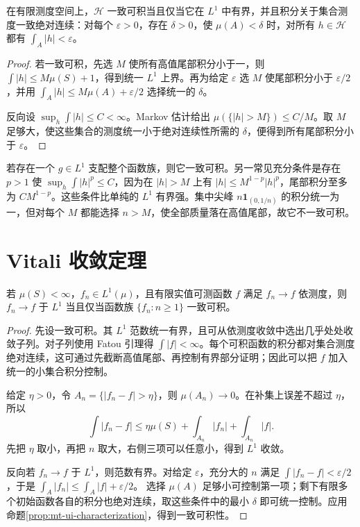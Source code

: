 \documentclass[UTF8,12pt,a4paper,fontset=fandol]{ctexbook}
\begin{document}
\begin{proposition}[一致可积性的等价判别]
在有限测度空间上，$\mathcal H$ 一致可积当且仅当它在 $L^1$ 中有界，并且积分关于集合测度一致绝对连续：对每个 $\varepsilon>0$，存在 $\delta>0$，使 $\mu(A)<\delta$ 时，对所有 $h\in\mathcal H$ 都有 $\int_A|h|<\varepsilon$。
\label{prop:mt-ui-characterization}
\end{proposition}
\begin{proof}
若一致可积，先选 $M$ 使所有高值尾部积分小于一，则
$\int|h|\leq M\mu(S)+1$，得到统一 $L^1$ 上界。再为给定 $\varepsilon$ 选 $M$ 使尾部积分小于 $\varepsilon/2$，并用
$\int_A|h|\leq M\mu(A)+\varepsilon/2$
选择统一的 $\delta$。

反向设 $\sup_h\int|h|\leq C<\infty$。Markov 估计给出
$\mu(\{|h|>M\})\leq C/M$。取 $M$ 足够大，使这些集合的测度统一小于绝对连续性所需的 $\delta$，便得到所有尾部积分小于 $\varepsilon$。
\end{proof}
若存在一个 $g\in L^1$ 支配整个函数族，则它一致可积。另一常见充分条件是存在 $p>1$ 使 $\sup_h\int|h|^p\leq C$，因为在 $|h|>M$ 上有 $|h|\leq M^{1-p}|h|^p$，尾部积分至多为 $CM^{1-p}$。这些条件比单纯的 $L^1$ 有界强。集中尖峰 $n\mathbf1_{(0,1/n)}$ 的积分统一为一，但对每个 $M$ 都能选择 $n>M$，使全部质量落在高值尾部，故它不一致可积。

\section{Vitali 收敛定理}
\begin{theorem}
若 $\mu(S)<\infty$，$f_n\in L^1(\mu)$，且有限实值可测函数 $f$ 满足 $f_n\to f$ 依测度，则 $f_n\to f$ 于 $L^1$ 当且仅当函数族 $\{f_n:n\geq1\}$ 一致可积。
\label{thm:mt-vitali-convergence}
\end{theorem}
\begin{proof}
先设一致可积。其 $L^1$ 范数统一有界，且可从依测度收敛中选出几乎处处收敛子列。对子列使用 Fatou 引理得 $\int|f|<\infty$。每个可积函数的积分都对集合测度绝对连续，这可通过先截断高值尾部、再控制有界部分证明；因此可以把 $f$ 加入统一的小集合积分控制。

给定 $\eta>0$，令 $A_n=\{|f_n-f|>\eta\}$，则 $\mu(A_n)\to0$。在补集上误差不超过 $\eta$，所以
\[
 \int|f_n-f|
 \leq\eta\mu(S)+\int_{A_n}|f_n|+\int_{A_n}|f|.
\]
先把 $\eta$ 取小，再把 $n$ 取大，右侧三项可以任意小，得到 $L^1$ 收敛。

反向若 $f_n\to f$ 于 $L^1$，则范数有界。对给定 $\varepsilon$，充分大的 $n$ 满足 $\int|f_n-f|<\varepsilon/2$，于是
$\int_A|f_n|\leq\int_A|f|+\varepsilon/2$。
选择 $\mu(A)$ 足够小可控制第一项；剩下有限多个初始函数各自的积分也绝对连续，取这些条件中的最小 $\delta$ 即可统一控制。应用命题\ref{prop:mt-ui-characterization}，得到一致可积性。
\end{proof}
\end{document}
